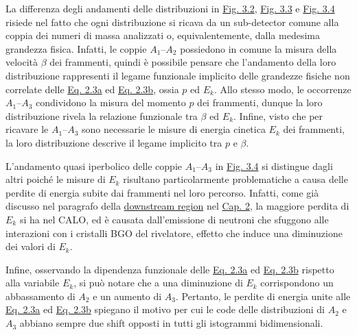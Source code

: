 \documentclass[12pt,a4paper,twoside]{report}
\begin{document}
	La differenza degli andamenti delle distribuzioni in \hyperref[fig:a1]{Fig. 3.2}, \hyperref[fig:a2]{Fig. 3.3} e \hyperref[fig:a3]{Fig. 3.4} risiede nel fatto che ogni distribuzione si ricava da un sub-detector comune alla coppia dei numeri di massa analizzati o, equivalentemente, dalla medesima grandezza fisica. Infatti, le coppie $A_1$--$A_2$ possiedono in comune la misura della velocità $\beta$ dei frammenti, quindi è possibile pensare che l'andamento della loro distribuzione rappresenti il legame funzionale implicito delle grandezze fisiche non correlate delle \hyperref[eq:a1]{Eq. 2.3a} ed \hyperref[eq:a2]{Eq. 2.3b}, ossia $p$ ed $E_k$. Allo stesso modo, le occorrenze $A_1$--$A_3$ condividono la misura del momento $p$ dei frammenti, dunque la loro distribuzione rivela la relazione funzionale tra $\beta$ ed $E_k$. Infine, visto che per ricavare le $A_1$--$A_3$ sono necessarie le misure di energia cinetica $E_k$ dei frammenti, la loro distribuzione descrive il legame implicito tra $p$ e $\beta$.
	
	L'andamento quasi iperbolico delle coppie $A_1$--$A_3$ in \hyperref[fig:a3]{Fig. 3.4} si distingue dagli altri poiché le misure di $E_k$ risultano particolarmente problematiche a causa delle perdite di energia subite dai frammenti nel loro percorso. Infatti, come già discusso nel paragrafo della \hyperref[par:downstream_region]{downstream region} nel \hyperref[cap:2]{Cap. 2}, la maggiore perdita di $E_k$ si ha nel CALO, ed è causata dall'emissione di neutroni che sfuggono alle interazioni con i cristalli BGO del rivelatore, effetto che induce una diminuzione dei valori di $E_k$.
	
	Infine, osservando la dipendenza funzionale delle \hyperref[eq:a1]{Eq. 2.3a} ed \hyperref[eq:a2]{Eq. 2.3b} rispetto alla variabile $E_k$, si può notare che a una diminuzione di $E_k$ corrispondono un abbassamento di $A_2$ e un aumento di $A_3$. Pertanto, le perdite di energia unite alle \hyperref[eq:a1]{Eq. 2.3a} ed \hyperref[eq:a2]{Eq. 2.3b} spiegano il motivo per cui le code delle distribuzioni di $A_2$ e $A_3$ abbiano sempre due shift opposti in tutti gli istogrammi bidimensionali.
	
\end{document}
